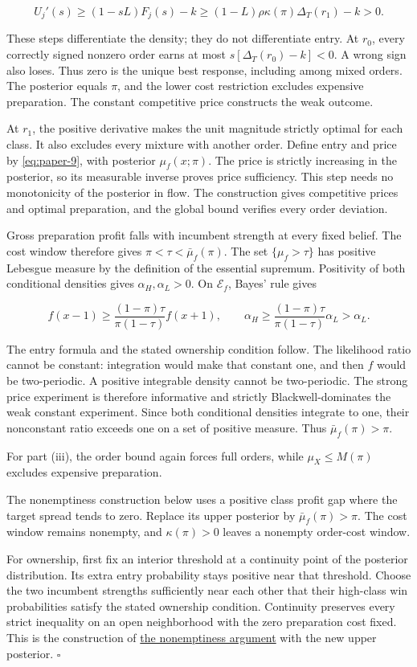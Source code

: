 \[
U_j'(s)\ge(1-sL)F_j(s)-k
\ge(1-L)\rho\kappa(\pi)\Delta_T(r_1)-k>0.
\]

These steps differentiate the density; they do not differentiate entry.
At \(r_0\), every correctly signed nonzero order earns at most
\(s[\Delta_T(r_0)-k]<0\).
A wrong sign also loses.
Thus zero is the unique best response, including among mixed orders.
The posterior equals \(\pi\), and the lower cost restriction excludes expensive preparation.
The constant competitive price constructs the weak outcome.
\par
At \(r_1\), the positive derivative makes the unit magnitude strictly optimal for each class.
It also excludes every mixture with another order.
Define entry and price by \eqref{eq:paper-9}, with posterior \(\mu_f(x;\pi)\).
The price is strictly increasing in the posterior, so its measurable inverse proves price sufficiency.
This step needs no monotonicity of the posterior in flow.
The construction gives competitive prices and optimal preparation, and the global bound verifies every order deviation.

Gross preparation profit falls with incumbent strength at every fixed belief.
The cost window therefore gives \(\pi<\tau<\bar\mu_f(\pi)\).
The set \(\{\mu_f>\tau\}\) has positive Lebesgue measure by the definition of the essential supremum.
Positivity of both conditional densities gives \(\alpha_H,\alpha_L>0\).
On \(\mathcal E_f\), Bayes' rule gives

\[
f(x-1)\ge
\frac{(1-\pi)\tau}{\pi(1-\tau)}f(x+1),\qquad
\alpha_H\ge\frac{(1-\pi)\tau}{\pi(1-\tau)}\alpha_L>\alpha_L.
\]

The entry formula and the stated ownership condition follow.
The likelihood ratio cannot be constant: integration would make that constant one, and then \(f\) would be two-periodic.
A positive integrable density cannot be two-periodic.
The strong price experiment is therefore informative and strictly Blackwell-dominates the weak constant experiment.
Since both conditional densities integrate to one, their nonconstant ratio exceeds one on a set of positive measure.
Thus \(\bar\mu_f(\pi)>\pi\).
\par
For part (iii), the order bound again forces full orders, while
\(\mu_X\le M(\pi)\) excludes expensive preparation.

The nonemptiness construction below uses a positive class profit gap where the target spread tends to zero.
Replace its upper posterior by \(\bar\mu_f(\pi)>\pi\).
The cost window remains nonempty, and \(\kappa(\pi)>0\) leaves a nonempty order-cost window.
\par
For ownership, first fix an interior threshold at a continuity point of the posterior distribution.
Its extra entry probability stays positive near that threshold.
Choose the two incumbent strengths sufficiently near each other that their high-class win probabilities satisfy the stated ownership condition.
Continuity preserves every strict inequality on an open neighborhood with the zero preparation cost fixed.
This is the construction of
\hyperref[nonemptiness-for-every-value-gap]{the nonemptiness argument} with the new upper posterior.
\(\square\)

